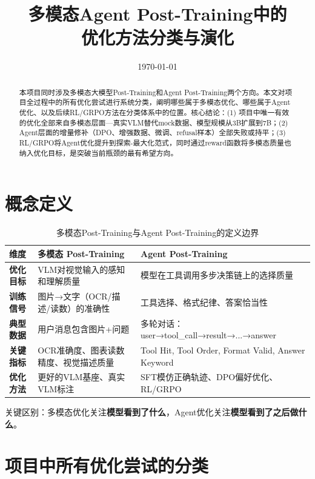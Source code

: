 \documentclass[fontset=none,11pt,a4paper]{ctexart}
\title{多模态Agent Post-Training中的\\优化方法分类与演化}
\author{}
\date{\today}
\begin{document}
\maketitle

\begin{abstract}
本项目同时涉及多模态大模型Post-Training和Agent Post-Training两个方向。本文对项目全过程中的所有优化尝试进行系统分类，阐明哪些属于多模态优化、哪些属于Agent优化、以及后续RL/GRPO方法在分类体系中的位置。核心结论：(1) 项目中唯一有效的优化全部来自多模态层面---真实VLM替代mock数据、模型规模从3B扩展到7B；(2) Agent层面的增量修补（DPO、增强数据、微调、refusal样本）全部失败或持平；(3) RL/GRPO将Agent优化提升到探索-最大化范式，同时通过reward函数将多模态质量也纳入优化目标，是突破当前瓶颈的最有希望方向。
\end{abstract}

\section{概念定义}

\begin{table}[htbp]
\centering
\begin{tabular}{lp{5cm}p{5cm}}
\toprule
维度 & 多模态 Post-Training & Agent Post-Training \\
\midrule
\textbf{优化目标} & VLM对视觉输入的感知和理解质量 & 模型在工具调用多步决策链上的选择质量 \\
\textbf{训练信号} & 图片→文字（OCR/描述/读数）的准确性 & 工具选择、格式纪律、答案恰当性 \\
\textbf{典型数据} & 用户消息包含图片+问题 & 多轮对话：user→tool\_call→result→...→answer \\
\textbf{关键指标} & OCR准确度、图表读数精度、视觉描述质量 & Tool Hit, Tool Order, Format Valid, Answer Keyword \\
\textbf{优化方法} & 更好的VLM基座、真实VLM标注 & SFT模仿正确轨迹、DPO偏好优化、RL/GRPO \\
\bottomrule
\end{tabular}
\caption{多模态Post-Training与Agent Post-Training的定义边界}
\label{tab:definition}
\end{table}

关键区别：多模态优化关注\textbf{模型看到了什么}，Agent优化关注\textbf{模型看到了之后做什么}。

\section{项目中所有优化尝试的分类}
\end{document}
